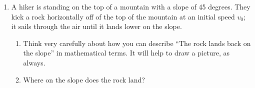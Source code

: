 \documentclass[12pt]{article}
\begin{document}
\begin{enumerate}
\item A hiker is standing on the top of a mountain with a slope of 45 degrees. They kick a rock horizontally off of the top of the mountain at an initial speed $v_0$; it sails through the air until it lands 
	lower on the slope.

	\begin{enumerate}
		\item Think very carefully about how you can describe ``The rock lands back on the slope'' in mathematical terms. It will help to draw a picture, as always.
		\item Where on the slope does the rock land?
	\end{enumerate}

\end{enumerate}
\end{document}
